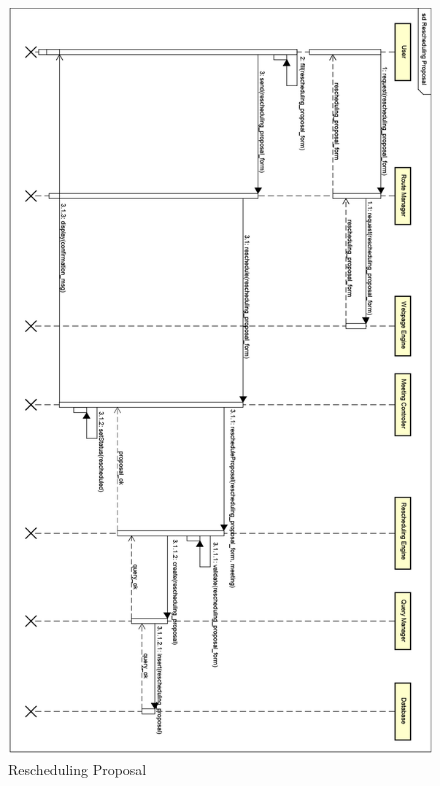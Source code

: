 \begin{figure}[h]
\centering\includegraphics[height = \textheight]{Images/RuntimeDiagrams/ReschedulingProposalOrizzontale.png}
\caption{Rescheduling Proposal}
\end{figure}
\clearpage